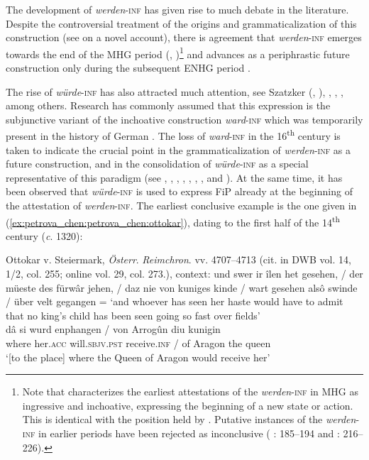 \documentclass[output=paper,colorlinks,citecolor=brown]{langscibook}
\begin{document}
The development of \textit{werden}-\textsc{inf} has given rise to much debate in the literature. Despite the controversial treatment of the origins and grammaticalization of this construction (see \cite{Jäger2024} on a novel account), there is agreement that \textit{werden}-\textsc{inf} emerges towards the end of the MHG period (\cite[261]{Behaghel1924}, \cite[296]{Paul2007})\footnote{Note that \citet[52]{Luther2013} characterizes the earliest attestations of the \textit{werden}-\textsc{inf} in MHG as ingressive and inchoative, expressing the beginning of a new state or action. This is identical with the position held by \citet[261, fn. 1]{Behaghel1924}. Putative instances of the \textit{werden}-\textsc{inf} in earlier periods have been rejected as inconclusive (\citeauthor{Saltveit1962} \citeyear{Saltveit1962}: 185--194 and \citeauthor{Jäger2024} \citeyear{Jäger2024}: 216--226).} and advances as a periphrastic future construction only during the subsequent ENHG period \citep[5]{Luther2012}.

The rise of \textit{würde}-\textsc{inf} has also attracted much attention, see Szatzker (\citeyear{Szatzker2002}, \citeyear{Szatzker2003}), \citet{Kotin2003}, \citet{Smirnova2006}, \citet{DurrellWhitt2016}, among others. Research has commonly assumed that this expression is the subjunctive variant of the inchoative construction \textit{ward}-\textsc{inf} which was temporarily present in the history of German \citep[307]{Paul2007}. The loss of \textit{ward}-\textsc{inf} in the 16\textsuperscript{th} century is taken to indicate the crucial point in the grammaticalization of \textit{werden}-\textsc{inf} as a future construction, and in the consolidation of \textit{würde}-\textsc{inf} as a special representative of this paradigm (see \cite[87]{Oubouzar1974}, \cite[221]{GuchmannSemenjuk1981}, \cite[392]{EbertEtAl1993}, \cite[58–61]{Szatzker2002}, \cite[175–189]{Kotin2003}, \cite[469]{Welke2005}, \cite[41–54 and 283–295]{Smirnova2006}, \cite[307]{Paul2007} and \cite[335]{DurrellWhitt2016}). At the same time, it has been observed that \textit{würde}-\textsc{inf} is used to express FiP already at the beginning of the attestation of \textit{werden}-\textsc{inf}. The earliest conclusive example is the one given in (\ref{ex:petrova_chen:petrova_chen:ottokar}), dating to the first half of the 14\textsuperscript{th} century (\textit{c}. 1320):

\ea\label{ex:petrova_chen:petrova_chen:ottokar} Ottokar v. Steiermark, \textit{Österr}. \textit{Reimchron}. vv. 4707--4713 (cit. in DWB vol. 14, 1/2, col. 255; online vol. 29, col. 273.), \newline context: und swer ir îlen het gesehen, / der müeste des fürwâr jehen, / daz nie von kuniges kinde / wart gesehen alsô swinde / über velt gegangen \newline = ‘and whoever has seen her haste would have to admit that no king’s child has been seen going so fast over fields’\\ 
    \gll dâ si wurd enphangen / von Arrogûn diu kunigin\\
    where her.\textsc{acc} will.\textsc{sbjv.pst} receive.\textsc{inf} / of Aragon the queen\\
    \glt ‘[to the place] where the Queen of Aragon would receive her’
\z
\end{document}
